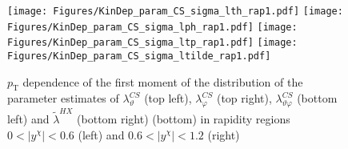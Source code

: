 \documentclass[12pt]{article}
\newcommand{\pT}{p_\mathrm{T}}
\newcommand{\absy}{\left |  y^{\chi} \right |}
\newcommand{\lamthCS}{\lambda^{\scriptscriptstyle CS}_\vartheta}
\newcommand{\lamphCS}{\lambda^{\scriptscriptstyle CS}_\varphi}
\newcommand{\lamthphCS}{\lambda^{\scriptscriptstyle CS}_{\vartheta \varphi}}
\newcommand{\lamtildeHX}{\tilde{\lambda}^{\scriptscriptstyle HX}}
\begin{document}
\begin{figure}[htbp]
\centering
\texttt{[image: Figures/KinDep\_param\_CS\_sigma\_lth\_rap1.pdf]}
\texttt{[image: Figures/KinDep\_param\_CS\_sigma\_lph\_rap1.pdf]}
\texttt{[image: Figures/KinDep\_param\_CS\_sigma\_ltp\_rap1.pdf]}
\texttt{[image: Figures/KinDep\_param\_CS\_sigma\_ltilde\_rap1.pdf]}
\caption{$\pT$ dependence of the first moment of the distribution of the parameter estimates of $\lamthCS$ (top left), $\lamphCS$ (top right), $\lamthphCS$
(bottom left) and $\lamtildeHX$ (bottom right) (bottom) in rapidity regions $0<\absy<0.6$ (left) and $0.6<\absy<1.2$ (right)}
\end{figure}
\clearpage
\end{document}
